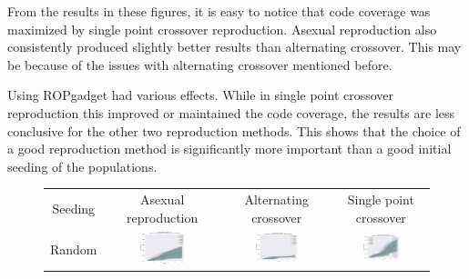 \documentclass{article}
\begin{document}
From the results in these figures, it is easy to notice that code coverage was maximized by single point crossover reproduction. Asexual reproduction also consistently produced slightly better results than alternating crossover. This may be because of the issues with alternating crossover mentioned before.

Using ROPgadget had various effects. While in single point crossover reproduction this improved or maintained the code coverage, the results are less conclusive for the other two reproduction methods. This shows that the choice of a good reproduction method is significantly more important than a good initial seeding of the populations.

\pagestyle{empty}
\begin{landscape}
\begin{figure}[t]
\begin{center}
\begin{tabular}{c c c c}
    Seeding & Asexual reproduction & Alternating crossover & Single point crossover \\
    Random & \includegraphics[align=c,width=0.42\textwidth]{cc/e1/1} & \includegraphics[align=c,width=0.42\textwidth]{cc/e1/2} & \includegraphics[align=c,width=0.42\textwidth]{cc/e1/3} \\

\end{tabular}
\end{center}
\end{figure}
\end{landscape}
\end{document}
